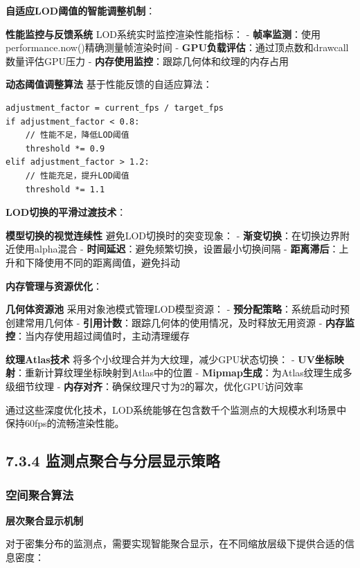 \textbf{自适应LOD阈值的智能调整机制}：

\textbf{性能监控与反馈系统} LOD系统实时监控渲染性能指标： - \textbf{帧率监测}：使用performance.now()精确测量帧渲染时间 - \textbf{GPU负载评估}：通过顶点数和drawcall数量评估GPU压力 - \textbf{内存使用监控}：跟踪几何体和纹理的内存占用

\textbf{动态阈值调整算法} 基于性能反馈的自适应算法：

\begin{verbatim}
adjustment_factor = current_fps / target_fps
if adjustment_factor < 0.8:
    // 性能不足，降低LOD阈值
    threshold *= 0.9
elif adjustment_factor > 1.2:
    // 性能充足，提升LOD阈值  
    threshold *= 1.1
\end{verbatim}

\textbf{LOD切换的平滑过渡技术}：

\textbf{模型切换的视觉连续性} 避免LOD切换时的突变现象： - \textbf{渐变切换}：在切换边界附近使用alpha混合 - \textbf{时间延迟}：避免频繁切换，设置最小切换间隔 - \textbf{距离滞后}：上升和下降使用不同的距离阈值，避免抖动

\textbf{内存管理与资源优化}：

\textbf{几何体资源池} 采用对象池模式管理LOD模型资源： - \textbf{预分配策略}：系统启动时预创建常用几何体 - \textbf{引用计数}：跟踪几何体的使用情况，及时释放无用资源 - \textbf{内存监控}：当内存使用超过阈值时，主动清理缓存

\textbf{纹理Atlas技术} 将多个小纹理合并为大纹理，减少GPU状态切换： - \textbf{UV坐标映射}：重新计算纹理坐标映射到Atlas中的位置 - \textbf{Mipmap生成}：为Atlas纹理生成多级细节纹理 - \textbf{内存对齐}：确保纹理尺寸为2的幂次，优化GPU访问效率

通过这些深度优化技术，LOD系统能够在包含数千个监测点的大规模水利场景中保持60fps的流畅渲染性能。

\subsection{7.3.4 监测点聚合与分层显示策略}\label{ux76d1ux6d4bux70b9ux805aux5408ux4e0eux5206ux5c42ux663eux793aux7b56ux7565}

\subsubsection{空间聚合算法}\label{ux7a7aux95f4ux805aux5408ux7b97ux6cd5}

\textbf{层次聚合显示机制}

对于密集分布的监测点，需要实现智能聚合显示，在不同缩放层级下提供合适的信息密度：

